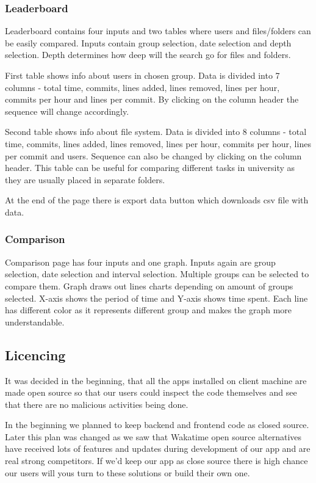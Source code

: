 \subsubsection{Leaderboard}\label{subsubsec:leaderboard}
Leaderboard contains four inputs and two tables where users and files/folders can be easily compared.
Inputs contain group selection, date selection and depth selection.
Depth determines how deep will the search go for files and folders.

First table shows info about users in chosen group.
Data is divided into 7 columns - total time, commits, lines added, lines removed, lines per hour, commits per hour and lines per commit.
By clicking on the column header the sequence will change accordingly.

Second table shows info about file system.
Data is divided into 8 columns - total time, commits, lines added, lines removed, lines per hour, commits per hour, lines per commit and users.
Sequence can also be changed by clicking on the column header.
This table can be useful for comparing different tasks in university as they are usually placed in separate folders.

At the end of the page there is export data button which downloads csv file with data.

\subsubsection{Comparison}\label{subsubsec:comparison}
Comparison page has four inputs and one graph.
Inputs again are group selection, date selection and interval selection.
Multiple groups can be selected to compare them.
Graph draws out lines charts depending on amount of groups selected.
X-axis shows the period of time and Y-axis shows time spent.
Each line has different color as it represents different group and makes the graph more understandable.

\subsection{Licencing}\label{subsec:licencing}
It was decided in the beginning, that all the apps installed on client machine are made open source so that
our users could inspect the code themselves and see that there are no malicious activities being done.

In the beginning we planned to keep backend and frontend code as closed source.
Later this plan was changed as we saw that Wakatime open source alternatives have received lots of features and updates
during development of our app and are real strong competitors.
If we'd keep our app as close source there is high chance our users will yous turn to these solutions or build their own one.

